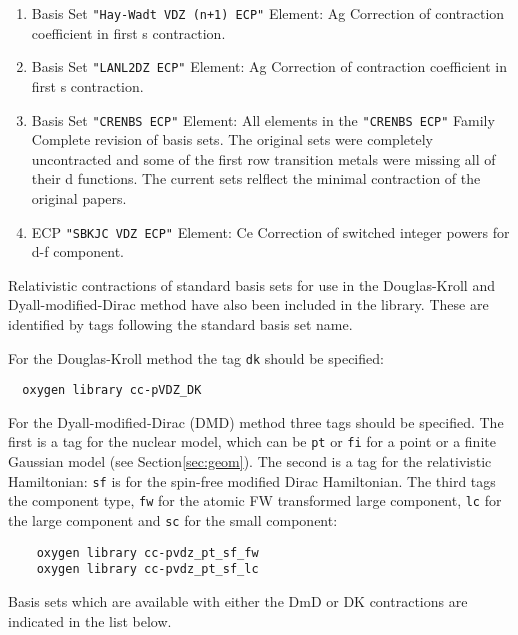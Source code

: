 \begin{enumerate}

\item Basis Set \verb#"Hay-Wadt VDZ (n+1) ECP"# \newline 
 Element: Ag \newline
 Correction of contraction coefficient in first s contraction.

\item Basis Set \verb#"LANL2DZ ECP"# \newline 
 Element: Ag \newline
 Correction of contraction coefficient in first s contraction.

\item Basis Set \verb#"CRENBS ECP"# \newline 
 Element: All elements in the \verb#"CRENBS ECP"# Family \newline
 Complete revision of basis sets. The original sets were completely uncontracted and
 some of the first row transition metals were missing all of their d functions. The
 current sets relflect the minimal contraction of the original papers.

\item ECP \verb#"SBKJC VDZ ECP"# \newline 
 Element: Ce \newline
 Correction of switched integer powers for d-f component.

\end{enumerate}

Relativistic contractions of standard basis sets for use in the Douglas-Kroll 
and Dyall-modified-Dirac method have also been included in the library. These
are identified by tags following the standard basis set name.  \newline

For the Douglas-Kroll method the tag \verb+dk+ should be specified: 

\begin{verbatim}
  oxygen library cc-pVDZ_DK
\end{verbatim}

For the Dyall-modified-Dirac (DMD) method three tags should be specified. The 
first is a tag for the nuclear model, which can be \verb+pt+ or \verb+fi+ for 
a point or a finite Gaussian model (see Section\ref{sec:geom}).  The second 
is a tag for the relativistic Hamiltonian: \verb+sf+ is for the spin-free 
modified Dirac Hamiltonian. The third tags the component type, \verb+fw+ for 
the atomic FW transformed large component, \verb+lc+ for the large component 
and \verb+sc+ for the small component: 
\begin{verbatim}
    oxygen library cc-pvdz_pt_sf_fw
    oxygen library cc-pvdz_pt_sf_lc
\end{verbatim} 
Basis sets which are available with either the DmD or DK contractions are
indicated in the list below.

